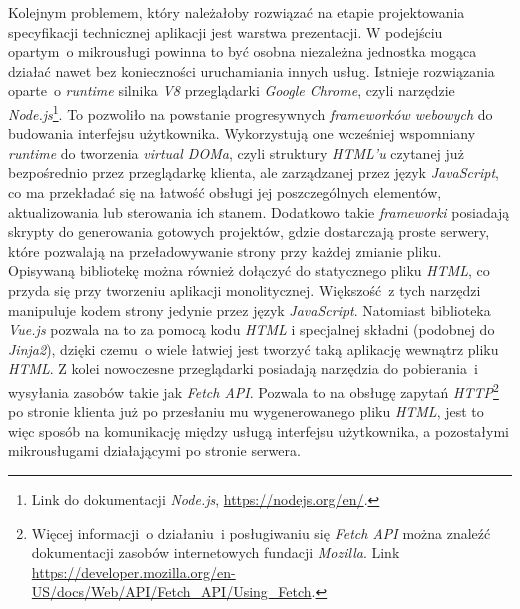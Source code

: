 Kolejnym problemem, który należałoby rozwiązać na etapie projektowania specyfikacji technicznej aplikacji jest warstwa prezentacji. W podejściu opartym~o mikrousługi powinna to być osobna niezależna jednostka mogąca działać nawet bez konieczności uruchamiania innych usług. Istnieje rozwiązania oparte~o \textit{runtime} silnika \textit{V8} przeglądarki \textit{Google Chrome}, czyli narzędzie \textit{Node.js}\footnote{Link do dokumentacji \textit{Node.js}, \url{https://nodejs.org/en/}.}. To pozwoliło na powstanie progresywnych \textit{frameworków webowych} do budowania interfejsu użytkownika\cite{vuejs}. Wykorzystują one wcześniej wspomniany \textit{runtime} do tworzenia \textit{virtual DOMa}, czyli struktury \textit{HTML'u} czytanej już bezpośrednio przez przeglądarkę klienta, ale zarządzanej przez język \textit{JavaScript}, co ma przekładać się na łatwość obsługi jej poszczególnych elementów, aktualizowania lub sterowania ich stanem\cite{vuejs}. Dodatkowo takie \textit{frameworki} posiadają skrypty do generowania gotowych projektów, gdzie dostarczają proste serwery, które pozwalają na przeładowywanie strony przy każdej zmianie pliku. Opisywaną bibliotekę można również dołączyć do statycznego pliku \textit{HTML}, co przyda się przy tworzeniu aplikacji monolitycznej. Większość~z tych narzędzi manipuluje kodem strony jedynie przez język \textit{JavaScript}\cite{vuejs}. Natomiast biblioteka \textit{Vue.js} pozwala na to za pomocą kodu \textit{HTML} i specjalnej składni (podobnej do \textit{Jinja2}), dzięki czemu~o wiele łatwiej jest tworzyć taką aplikację wewnątrz pliku \textit{HTML}. Z kolei nowoczesne przeglądarki posiadają narzędzia do pobierania~i wysyłania zasobów takie jak \textit{Fetch API}\cite{mdn}. Pozwala to na obsługę zapytań \textit{HTTP}\footnote{Więcej informacji~o działaniu~i posługiwaniu się \textit{Fetch API} można znaleźć dokumentacji zasobów internetowych fundacji \textit{Mozilla}. Link \url{https://developer.mozilla.org/en-US/docs/Web/API/Fetch_API/Using_Fetch}.} po stronie klienta już po przesłaniu mu wygenerowanego pliku \textit{HTML}, jest to więc sposób na komunikację między usługą interfejsu użytkownika, a pozostałymi mikrousługami działającymi po stronie serwera.


